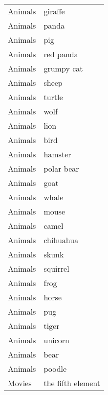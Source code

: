 \begin{supertabular}{l p{0.25\textwidth}}
          Animals &                            giraffe \\
          Animals &                              panda \\
          Animals &                                pig \\
          Animals &                          red panda \\
          Animals &                         grumpy cat \\
          Animals &                              sheep \\
          Animals &                             turtle \\
          Animals &                               wolf \\
          Animals &                               lion \\
          Animals &                               bird \\
          Animals &                            hamster \\
          Animals &                         polar bear \\
          Animals &                               goat \\
          Animals &                              whale \\
          Animals &                              mouse \\
          Animals &                              camel \\
          Animals &                          chihuahua \\
          Animals &                              skunk \\
          Animals &                           squirrel \\
          Animals &                               frog \\
          Animals &                              horse \\
          Animals &                                pug \\
          Animals &                              tiger \\
          Animals &                            unicorn \\
          Animals &                               bear \\
          Animals &                             poodle \\
           Movies &                  the fifth element \\

\end{supertabular}
